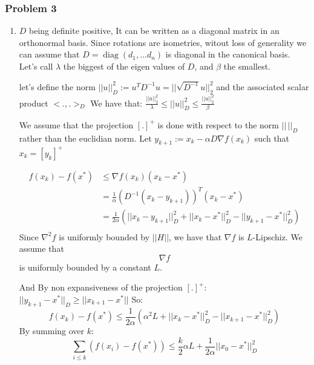 \documentclass[12pt]{article}
\newcommand{\Q}[1]{\subsubsection*{Problem #1}}
\begin{document}
\Q{3}
\begin{enumerate}
\item
  $D$ being definite positive, It can be written as a diagonal matrix in an orthonormal basis.
  Since  rotations are isometries, witout loss of generality we can assume that $D = \operatorname{diag}(d_1, ... d_n) $ is diagonal in the canonical basis.
  Let's call $\lambda$ the biggest of the eigen values of $D$, and $\beta$ the smallest.

  let's define the norm $||u||_D^2 := u^T D^{-1} u = ||\sqrt{D^{-1}}u||_2^2$ and the associated scalar product $<.,.>_D$
  We have that: $ \frac{||u||_2^2}{\lambda} \le ||u||_D^2 \le \frac{||u||_2^2}{\beta}$
  
  We assume that the projection $[.]^+$ is done with
  respect to the norm $||\, ||_D$ rather than the euclidian norm.
  Let $y_{k+1} := x_k - \alpha D \nabla f(x_k)$ such that $x_k = [y_k]^+$

  \begin{align*}
    f(x_k) - f(x^*) & \le \nabla f(x_k) (x_k - x^*) \\
                    &= \frac1 \alpha (D^{-1}(x_k - y_{k+1}))^T (x_k - x^*) \\
                    &= \frac1 {2\alpha} ( ||x_k - y_{k+1}||_D^2 + ||x_k - x^*||_D^2 - ||y_{k+1} - x^*||_D^2 ) \\
  \end{align*}
  Since $\nabla^2f$ is uniformly bounded by $||H||$, we have that $\nabla f$ is $L$-Lipschiz.
  We assume that $$\nabla f$$ is uniformly bounded by a constant $L$.

  And By non expansiveness of the projection $[.]^+$:  $||y_{k+1} - x^*||_D \ge ||x_{k+1} - x^*||$
  So:
  $$f(x_k) - f(x^*) \le \frac 1{2\alpha} (\alpha^2 L + ||x_k - x^*||_D^2 - ||x_{k+1} - x^*||_D^2)$$
  By summing over $k$:
  $$\sum_{i \le k} (f(x_i) - f(x^*)) \le \frac{k}2 \alpha L + \frac{1}{2\alpha} ||x_0 - x^*||_D^2$$


\end{enumerate}
\end{document}
